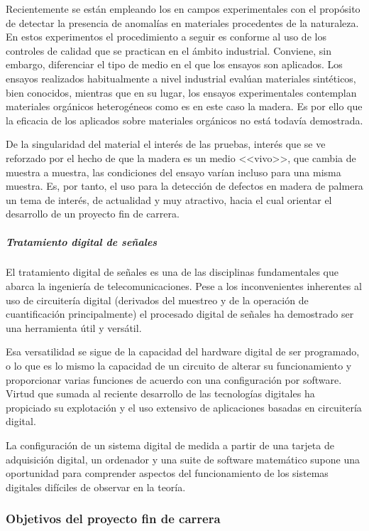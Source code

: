Recientemente se están empleando los  en campos experimentales con el propósito de detectar la presencia de anomalías en materiales procedentes de la naturaleza. En estos experimentos el procedimiento a seguir es conforme al uso de los controles de calidad que se practican en el ámbito industrial. Conviene, sin embargo, diferenciar el tipo de medio en el que los ensayos son aplicados. Los ensayos realizados habitualmente a nivel industrial evalúan materiales sintéticos, bien conocidos, mientras que en su lugar, los ensayos experimentales contemplan materiales orgánicos heterogéneos como es en este caso la madera. Es por ello que la eficacia de los  aplicados sobre materiales orgánicos no está todavía demostrada.\par
De la singularidad del material el interés de las pruebas, interés que se ve reforzado por el hecho de que la madera es un medio <<vivo>>, que cambia de muestra a muestra, las condiciones del ensayo varían incluso para una misma muestra. Es, por tanto, el uso  para la detección de defectos en madera de palmera un tema de interés, de actualidad y muy atractivo, hacia el cual orientar el desarrollo de un proyecto fin de carrera.


\subparagraph{Tratamiento digital de señales}

El tratamiento digital de señales es una de las disciplinas fundamentales que abarca la ingeniería de telecomunicaciones. Pese a los inconvenientes inherentes al uso de circuitería digital (derivados del muestreo y de la operación de cuantificación principalmente) el procesado digital de señales ha demostrado ser una herramienta útil y versátil.\par
Esa versatilidad se sigue de la capacidad del hardware digital de ser programado, o lo que es lo mismo la capacidad de un circuito de alterar su funcionamiento y proporcionar varias funciones de acuerdo con una configuración por software. Virtud que sumada al reciente desarrollo de las tecnologías digitales ha propiciado su explotación y el uso extensivo de aplicaciones basadas en circuitería digital.\par
La configuración de un sistema digital de medida a partir de una tarjeta de adquisición digital, un ordenador y una suite de software matemático supone una oportunidad para comprender aspectos del funcionamiento de los sistemas digitales difíciles de observar en la teoría.


\subsubsection{Objetivos del proyecto fin de carrera}\label{sec:goals}

